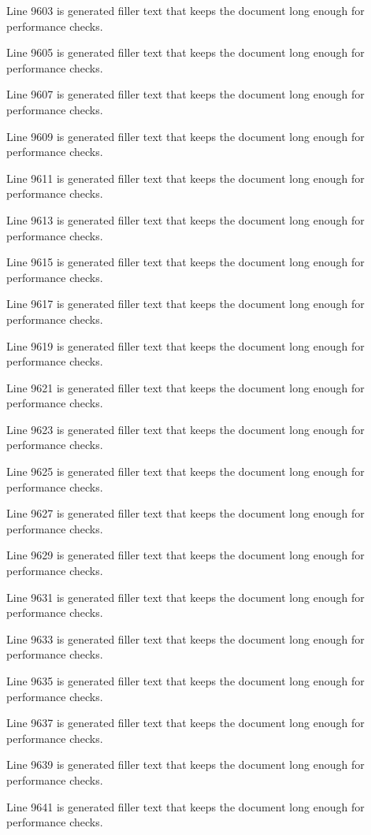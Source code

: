 Line 9603 is generated filler text that keeps the document long enough for performance checks.

Line 9605 is generated filler text that keeps the document long enough for performance checks.

Line 9607 is generated filler text that keeps the document long enough for performance checks.

Line 9609 is generated filler text that keeps the document long enough for performance checks.

Line 9611 is generated filler text that keeps the document long enough for performance checks.

Line 9613 is generated filler text that keeps the document long enough for performance checks.

Line 9615 is generated filler text that keeps the document long enough for performance checks.

Line 9617 is generated filler text that keeps the document long enough for performance checks.

Line 9619 is generated filler text that keeps the document long enough for performance checks.

Line 9621 is generated filler text that keeps the document long enough for performance checks.

Line 9623 is generated filler text that keeps the document long enough for performance checks.

Line 9625 is generated filler text that keeps the document long enough for performance checks.

Line 9627 is generated filler text that keeps the document long enough for performance checks.

Line 9629 is generated filler text that keeps the document long enough for performance checks.

Line 9631 is generated filler text that keeps the document long enough for performance checks.

Line 9633 is generated filler text that keeps the document long enough for performance checks.

Line 9635 is generated filler text that keeps the document long enough for performance checks.

Line 9637 is generated filler text that keeps the document long enough for performance checks.

Line 9639 is generated filler text that keeps the document long enough for performance checks.

Line 9641 is generated filler text that keeps the document long enough for performance checks.

